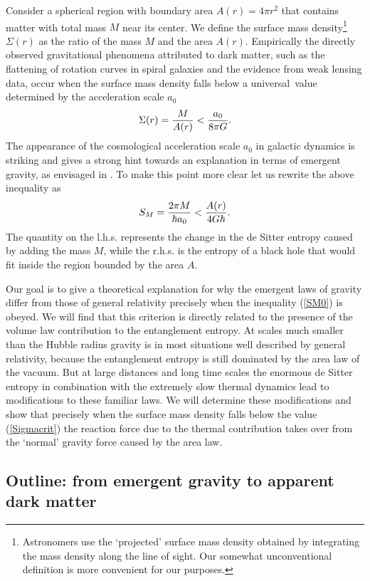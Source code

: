 \documentclass[a4paper,12pt]{article}
\newcommand{\be}{\begin{equation}}
\newcommand{\ee}{\end{equation}}
\begin{document}
Consider a spherical region with boundary area $A(r)= 4\pi r^2$ that contains matter with total mass $M$ 
near its center. 
We define the surface mass density\footnote{Astronomers use the  
`projected' surface mass density obtained by integrating the mass density along 
the line of sight. Our somewhat unconventional definition is more convenient for our purposes.}
$\Sigma(r)$ as the ratio of the mass $M$ and the area $A(r)$. 
Empirically the directly observed gravitational phenomena attributed to dark matter, such as the flattening of rotation curves in spiral galaxies and the evidence from weak lensing data, occur when 
the surface mass density falls below a universal~value determined by the acceleration scale $a_0$
\be
\label{Sigmacrit}
\Sigma (r)=
{M\over A(r)}< {a_0\over 8\pi G}.   
\ee  
 The appearance of the cosmological acceleration scale $a_0$ in galactic dynamics is 
 striking and gives a strong hint towards an explanation in terms of emergent gravity, as envisaged in \cite{Milgromvac}. 
 To make this point more clear let us rewrite the above inequality as
\be
\label{SM0}
S_M= {2\pi M\over \hbar a_0} < {A(r)\over 4G\hbar}.
\ee
 The quantity on the l.h.s. represents the change in the de Sitter entropy 
caused by adding the mass $M$, while the r.h.s. is the entropy of a black hole 
that would fit inside the region bounded by the area $A$.  

Our goal is to  give a theoretical explanation for why the  emergent laws of gravity differ from those of general relativity precisely when the inequality (\ref{SM0}) is obeyed.  We will find that this criterion  is directly related to the presence of the volume law contribution to the entanglement entropy.   At scales much smaller than the Hubble radius gravity is in most situations well described by general relativity, because the entanglement entropy is still dominated by the area law of the vacuum.  But at large distances and long time scales the enormous de Sitter entropy in combination with the extremely slow thermal dynamics lead to modifications to these familiar laws. We will determine these modifications and show that precisely when the surface mass density falls below the value (\ref{Sigmacrit}) the reaction force due to the thermal contribution takes over from the `normal' gravity force caused by the area law. 


\subsection{Outline: from emergent gravity to apparent dark matter}
\end{document}
